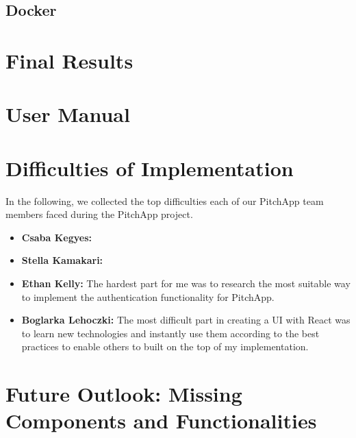 \section{Docker}
\chapter{Final Results}
\chapter{User Manual}
\chapter{Difficulties of Implementation}
In the following, we collected the top difficulties each of our PitchApp team members faced during the PitchApp project.

\begin{itemize}
	\item \textbf{Csaba Kegyes:}
    \item \textbf{Stella Kamakari:}
	\item \textbf{Ethan Kelly:} The hardest part for me was to research the most suitable way to implement the authentication functionality for PitchApp.
	\item \textbf{Boglarka Lehoczki:} The most difficult part in creating a UI with React was to learn new technologies and instantly use them according to the best practices to enable others to built on the top of my implementation.

\end{itemize}
\chapter{Future Outlook: Missing Components and Functionalities}



